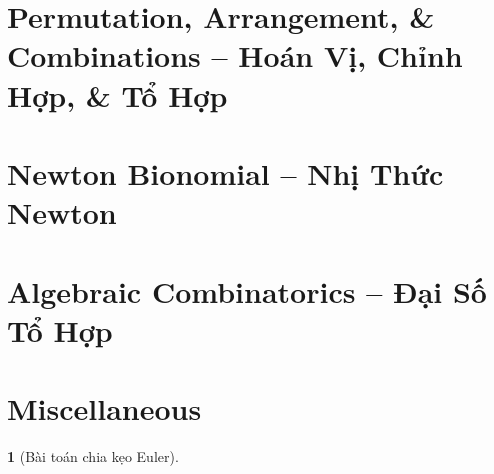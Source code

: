 \documentclass{article}
\newtheorem{baitoan}{}
\begin{document}

\section{Permutation, Arrangement, \& Combinations -- Hoán Vị, Chỉnh Hợp, \& Tổ Hợp}


\section{Newton Bionomial -- Nhị Thức Newton}


\section{Algebraic Combinatorics -- Đại Số Tổ Hợp}


\section{Miscellaneous}

\begin{baitoan}[Bài toán chia kẹo Euler]
	
\end{baitoan}


\printbibliography[heading=bibintoc]
	
\end{document}

